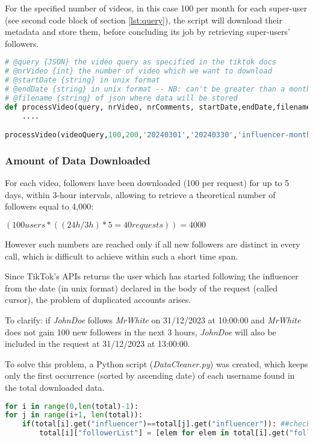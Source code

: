 For the specified number of videos, in this case 100 per month for each super-user (see second code block of section \ref{lst:query}), the script will download their metadata and store them, before concluding its job by retrieving super-users' followers.

\begin{lstlisting}[language=Python]
# @query {JSON} the video query as specified in the tiktok docs
# @nrVideo {int} the number of video which we want to download
# @startDate {string} in unix format
# @endDate {string} in unix format -- NB: can't be greater than a month
# @filename {string} of json where data will be stored
def processVideo(query, nrVideo, nrComments, startDate,endDate,filename):
    ....

processVideo(videoQuery,100,200,'20240301','20240330','influencer-month')
\end{lstlisting}

\subsubsection*{Amount of Data Downloaded}

For each video, followers have been downloaded (100 per request) for up to 5 days, within 3-hour intervals, allowing to retrieve a theoretical number of followers equal to 4,000:

$(100 users * ((24h/3h)*5 = 40 requests )) = 4000$

However such numbers are reached only if all new followers are distinct in every call, which is difficult to achieve within such a short time span.

Since TikTok's APIs returns the user which has started following the influencer from the date (in unix format) declared in the body of the request (called cursor), the problem of duplicated accounts arises.

To clarify: if \textit{JohnDoe} follows \textit{MrWhite} on 31/12/2023 at 10:00:00 and \textit{MrWhite} does not gain 100 new followers in the next 3 hours, \textit{JohnDoe} will also be included in the request at 31/12/2023 at 13:00:00.

To solve this problem, a Python script (\textit{DataCleaner.py}) was created, which keeps only the first occurrence (sorted by ascending date) of each username found in the total downloaded data.

\begin{lstlisting}[language=Python]
for i in range(0,len(total)-1):
for j in range(i+1, len(total)):
    if(total[i].get("influencer")==total[j].get("influencer")): ##check if the same influencer (we don't want to remove common followers)
        total[i]["followerList"] = [elem for elem in total[i].get("followerList") if elem not in total[j].get("followerList")]
\end{lstlisting}

